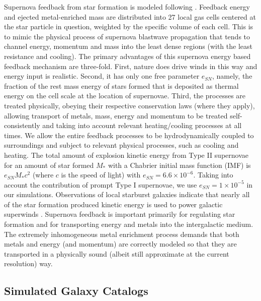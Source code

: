 Supernova feedback from star formation is modeled following \citet[][]{2005Cen}.
Feedback energy and ejected metal-enriched mass are distributed into 
27 local gas cells centered at the star particle in question, 
weighted by the specific volume of each cell. 
This is to mimic the physical process of supernova
blastwave propagation that tends to channel energy, momentum and mass into the least dense regions
(with the least resistance and cooling).
The primary advantages of this supernova energy based feedback mechanism are three-fold.
First, nature does drive winds in this way and energy input is realistic.
Second, it has only one free parameter $e_{SN}$, namely, the fraction of the rest mass energy of stars formed
that is deposited as thermal energy on the cell scale at the location of supernovae.
Third, the processes are treated physically, obeying their respective conservation laws (where they apply),
allowing transport of metals, mass, energy and momentum to be treated self-consistently
and taking into account relevant heating/cooling processes at all times.
We allow the entire feedback processes to be hydrodynamically coupled to surroundings
and subject to relevant physical processes, such as cooling and heating. %
The total amount of explosion kinetic energy from Type II supernovae
for an amount of star formed $M_{*}$
with a Chabrier initial mass function (IMF) is $e_{SN} M_* c^2$ (where $c$ is the speed of light)
with  $e_{SN}=6.6\times 10^{-6}$.
Taking into account the contribution of prompt Type I supernovae,
we use $e_{SN}=1\times 10^{-5}$ in our simulations.
Observations of local starburst galaxies indicate
that nearly all of the star formation produced kinetic energy 
is used to power galactic superwinds \citep[e.g.,][]{2001Heckman}. 
Supernova feedback is important primarily for regulating star formation
and for transporting energy and metals into the intergalactic medium.
The extremely inhomogeneous metal enrichment process
demands that both metals and energy (and momentum) are correctly modeled so that they
are transported in a physically sound (albeit still approximate at the current resolution) way.






\subsection{Simulated Galaxy Catalogs}

